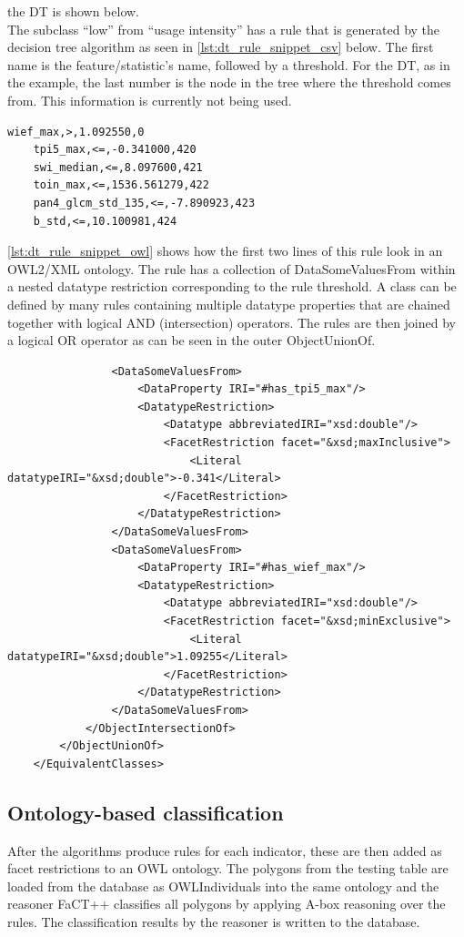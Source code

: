 \documentclass[authoryear, review,12pt,number]{elsarticle}
\begin{document}
the DT is shown below.
\\
The subclass ``low'' from ``usage intensity'' has a rule that is generated by
the decision tree algorithm as seen in \ref{lst:dt_rule_snippet_csv} below. 
The first name is the feature/statistic's name, followed by a threshold. For 
the DT, as in the example, the last number is the node in the tree where the 
threshold comes from. This information is currently not being used.
\label{lst:dt_rule_snippet_csv}
\begin{lstlisting}[frame=single]
    wief_max,>,1.092550,0
    tpi5_max,<=,-0.341000,420
    swi_median,<=,8.097600,421
    toin_max,<=,1536.561279,422
    pan4_glcm_std_135,<=,-7.890923,423
    b_std,<=,10.100981,424
\end{lstlisting}
\ref{lst:dt_rule_snippet_owl} shows how the first two 
lines of this rule look in an OWL2/XML ontology. The rule has a collection of 
DataSomeValuesFrom within a nested datatype restriction corresponding to the 
rule threshold. A class can be defined by many rules containing multiple 
datatype properties that are chained together with logical AND (intersection) 
operators. The rules are then joined by a logical OR operator as can be seen in 
the outer ObjectUnionOf.  
\label{lst:dt_rule_snippet_owl}
\begin{lstlisting}
                <DataSomeValuesFrom>
                    <DataProperty IRI="#has_tpi5_max"/>
                    <DatatypeRestriction>
                        <Datatype abbreviatedIRI="xsd:double"/>
                        <FacetRestriction facet="&xsd;maxInclusive">
                            <Literal datatypeIRI="&xsd;double">-0.341</Literal>
                        </FacetRestriction>
                    </DatatypeRestriction>
                </DataSomeValuesFrom>
                <DataSomeValuesFrom>
                    <DataProperty IRI="#has_wief_max"/>
                    <DatatypeRestriction>
                        <Datatype abbreviatedIRI="xsd:double"/>
                        <FacetRestriction facet="&xsd;minExclusive">
                            <Literal datatypeIRI="&xsd;double">1.09255</Literal>
                        </FacetRestriction>
                    </DatatypeRestriction>
                </DataSomeValuesFrom>
            </ObjectIntersectionOf>
        </ObjectUnionOf>
    </EquivalentClasses>
\end{lstlisting}
\subsection{Ontology-based classification}
\label{subsec:Onto_classification}
After the algorithms produce rules for each indicator, these are then added as 
facet restrictions to an OWL ontology. The polygons from the testing table are 
loaded from the database as OWLIndividuals into the same ontology and the 
reasoner FaCT++ classifies all polygons by applying A-box reasoning over the 
rules. The classification results by the reasoner is written to the database. 
\end{document}
